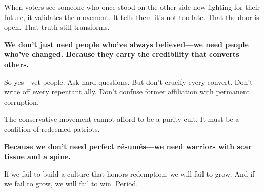 When voters see someone who once stood on the other side now fighting for their future, it validates the movement. It tells them it’s not too late. That the door is open. That truth still transforms.

\textbf{We don’t just need people who’ve always believed—we need people who’ve changed. Because they carry the credibility that converts others.}

So yes—vet people. Ask hard questions. But don’t crucify every convert. Don’t write off every repentant ally. Don’t confuse former affiliation with permanent corruption.

The conservative movement cannot afford to be a purity cult. It must be a coalition of redeemed patriots.

\textbf{Because we don’t need perfect résumés—we need warriors with scar tissue and a spine.}

If we fail to build a culture that honors redemption, we will fail to grow. And if we fail to grow, we will fail to win. Period.
